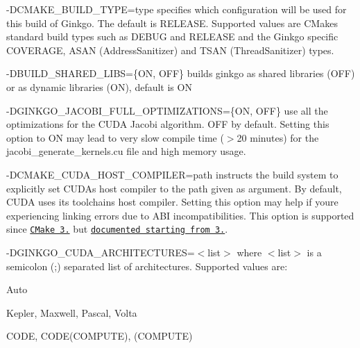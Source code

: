 \begin{DoxyItemize}
\item {\ttfamily -\/\+D\+C\+M\+A\+K\+E\+\_\+\+B\+U\+I\+L\+D\+\_\+\+T\+Y\+PE=type} specifies which configuration will be used for this build of Ginkgo. The default is {\ttfamily R\+E\+L\+E\+A\+SE}. Supported values are C\+Make\textquotesingle{}s standard build types such as {\ttfamily D\+E\+B\+UG} and {\ttfamily R\+E\+L\+E\+A\+SE} and the Ginkgo specific {\ttfamily C\+O\+V\+E\+R\+A\+GE}, {\ttfamily A\+S\+AN} (Address\+Sanitizer) and {\ttfamily T\+S\+AN} (Thread\+Sanitizer) types.
\item {\ttfamily -\/\+D\+B\+U\+I\+L\+D\+\_\+\+S\+H\+A\+R\+E\+D\+\_\+\+L\+I\+BS=\{ON, O\+FF\}} builds ginkgo as shared libraries ({\ttfamily O\+FF}) or as dynamic libraries ({\ttfamily ON}), default is {\ttfamily ON}
\item {\ttfamily -\/\+D\+G\+I\+N\+K\+G\+O\+\_\+\+J\+A\+C\+O\+B\+I\+\_\+\+F\+U\+L\+L\+\_\+\+O\+P\+T\+I\+M\+I\+Z\+A\+T\+I\+O\+NS=\{ON, O\+FF\}} use all the optimizations for the C\+U\+DA Jacobi algorithm. {\ttfamily O\+FF} by default. Setting this option to {\ttfamily ON} may lead to very slow compile time ($>$20 minutes) for the {\ttfamily jacobi\+\_\+generate\+\_\+kernels.\+cu} file and high memory usage.
\item {\ttfamily -\/\+D\+C\+M\+A\+K\+E\+\_\+\+C\+U\+D\+A\+\_\+\+H\+O\+S\+T\+\_\+\+C\+O\+M\+P\+I\+L\+ER=path} instructs the build system to explicitly set C\+U\+DA\textquotesingle{}s host compiler to the path given as argument. By default, C\+U\+DA uses its toolchain\textquotesingle{}s host compiler. Setting this option may help if you\textquotesingle{}re experiencing linking errors due to A\+BI incompatibilities. This option is supported since \href{https://github.com/Kitware/CMake/commit/489c52ce680df6439f9c1e553cd2925ca8944cb1}{\tt C\+Make 3.} but \href{https://cmake.org/cmake/help/v3.10/variable/CMAKE_CUDA_HOST_COMPILER.html}{\tt documented starting from 3.}.
\item {\ttfamily -\/\+D\+G\+I\+N\+K\+G\+O\+\_\+\+C\+U\+D\+A\+\_\+\+A\+R\+C\+H\+I\+T\+E\+C\+T\+U\+R\+ES=$<$list$>$} where {\ttfamily $<$list$>$} is a semicolon ({\ttfamily ;}) separated list of architectures. Supported values are\+:
\begin{DoxyItemize}
\item {\ttfamily Auto}
\item {\ttfamily Kepler}, {\ttfamily Maxwell}, {\ttfamily Pascal}, {\ttfamily Volta}
\item {\ttfamily C\+O\+DE}, {\ttfamily C\+O\+D\+E(\+C\+O\+M\+P\+U\+T\+E)}, {\ttfamily (C\+O\+M\+P\+U\+TE)}
\end{DoxyItemize}


\end{DoxyItemize}

